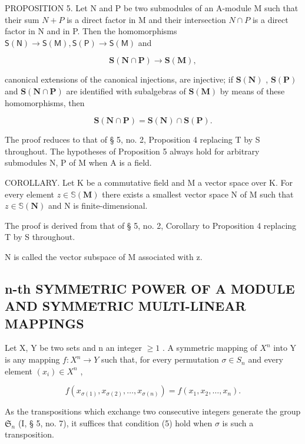 PROPOSITION 5. Let N and P be two submodules of an A-module M such that their sum \(N + P\) is a direct factor in M and their intersection \(N \cap P\) is a direct factor in N and in P. Then the homomorphisms \(\mathsf{S}(\mathsf{N}) \to \mathsf{S}(\mathsf{M}), \mathsf{S}(\mathsf{P}) \to \mathsf{S}(\mathsf{M})\) and

\[
\mathbf {S} (\mathbf {N} \cap \mathbf {P}) \rightarrow \mathbf {S} (\mathbf {M}),
\]

canonical extensions of the canonical injections, are injective; if \(\mathbf{S}(\mathbf{N})\) , \(\mathbf{S}(\mathbf{P})\) and \(\mathbf{S}(\mathbf{N} \cap \mathbf{P})\) are identified with subalgebras of \(\mathbf{S}(\mathbf{M})\) by means of these homomorphisms, then

\[
\mathbf {S} (\mathbf {N} \cap \mathbf {P}) = \mathbf {S} (\mathbf {N}) \cap \mathbf {S} (\mathbf {P}).\tag{4}
\]

The proof reduces to that of § 5, no. 2, Proposition 4 replacing T by S throughout. The hypotheses of Proposition 5 always hold for arbitrary submodules N, P of M when A is a field.

COROLLARY. Let K be a commutative field and M a vector space over K. For every element \(z \in \mathbb{S}(\mathbf{M})\) there exists a smallest vector space N of M such that \(z \in \mathbb{S}(\mathbf{N})\) and N is finite-dimensional.

The proof is derived from that of § 5, no. 2, Corollary to Proposition 4 replacing T by S throughout.

N is called the vector subspace of M associated with z.

\subsection{n-th SYMMETRIC POWER OF A MODULE AND SYMMETRIC MULTI-LINEAR MAPPINGS}

Let X, Y be two sets and n an integer \(\geqslant1\) . A symmetric mapping of \(X^{n}\) into Y is any mapping \(f: X^{n} \to Y\) such that, for every permutation \(\sigma \in S_{n}\) and every element \((x_{i}) \in X^{n}\) ,

\[
f (x _ {\sigma (1)}, x _ {\sigma (2)}, \dots , x _ {\sigma (n)}) = f (x _ {1}, x _ {2}, \dots , x _ {n}).\tag{5}
\]

As the transpositions which exchange two consecutive integers generate the group \(\mathfrak{S}_n\) (I, § 5, no. 7), it suffices that condition (5) hold when \(\sigma\) is such a transposition.

